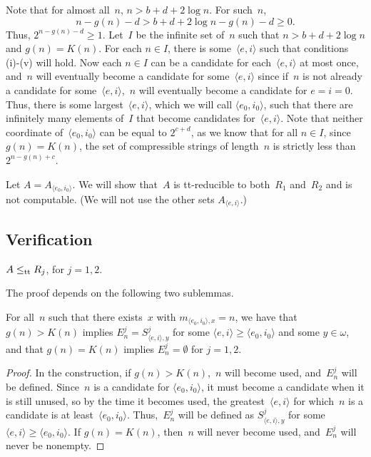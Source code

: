 \documentclass{LMCS}
\newcommand{\0}{\mathbf{0}}
\newcommand{\lett}{\leq_{\rm {tt}}}
\newcommand{\RKUj}{R_j}
\newcommand{\ei}{{\langle e,i\rangle}}
\newcommand{\eizero}{{\langle e_0,i_0\rangle}}
\newcommand{\meizerox}{{m_{\eizero,x}}}
\newcommand{\<}{\langle}
\renewcommand{\>}{\rangle}
\begin{document}
Note that for almost all~$n$, $n>b+d+2\log n$.  For such~$n$,
$$
n-g(n)-d > b+d+2\log n -g(n) -d \geq 0.
$$
Thus, $2^{n-g(n)-d}\geq 1$. Let~$I$ be the infinite set of~$n$ such that
$n>b+d+2\log n$ and $g(n)=K(n)$.  For each $n\in I$, there is some~$\ei$ such
that conditions (i)-(v) will hold.  Now each $n \in I$ can be a candidate for
each~$\ei$ at most once, and~$n$ will eventually become a candidate for
some~$\ei$ since if~$n$ is not already a candidate for some~$\ei$,~$n$ will
eventually become a candidate for $e=i=0$.  Thus, there is some
largest~$\ei$, which we will call $\eizero$, such that there are infinitely
many elements of~$I$ that become candidates for~$\ei$.  Note that neither
coordinate of~$\eizero$ can be equal to $2^{c+d}$, as we know that for all
$n\in I$, since $g(n)=K(n)$, the set of compressible strings of length~$n$ is
strictly less than $2^{n-g(n)+c}$.

Let $A=A_\eizero$.  We will show that~$A$ is tt-reducible to both~$R_1$
and~$R_2$ and is not computable.  (We will not use the other sets $A_\ei$.)




\subsection{Verification}

\begin{lem}\label{ttlemma}
$A\lett \RKUj$, for $j=1, 2$.
\end{lem}

The proof depends on the following two sublemmas.

\begin{slem}
\label{Esublemma} For all~$n$ such that there exists~$x$ with $\meizerox=n$,
we have that $g(n)>K(n)$ implies $E^j_n=S^j_{\ei,y}$ for some $\ei\geq
\eizero$ and some $y\in \omega$, and that $g(n)=K(n)$ implies
$E^j_n=\emptyset$ for $j=1, 2$.
\end{slem}

\begin{proof}
In the construction, if $g(n)>K(n)$,~$n$ will become used, and~$E^j_n$ will
be defined.  Since~$n$ is a candidate for $\eizero$, it must become a
candidate when it is still unused, so by the time it becomes used, the
greatest~$\ei$ for which~$n$ is a candidate is at least~$\eizero$.
Thus,~$E^j_n$ will be defined as $S^j_{\ei,y}$ for some $\ei\geq \eizero$. If
$g(n)=K(n)$, then~$n$ will never become used, and~$E^j_n$ will never be
nonempty.
\end{proof}
\end{document}
